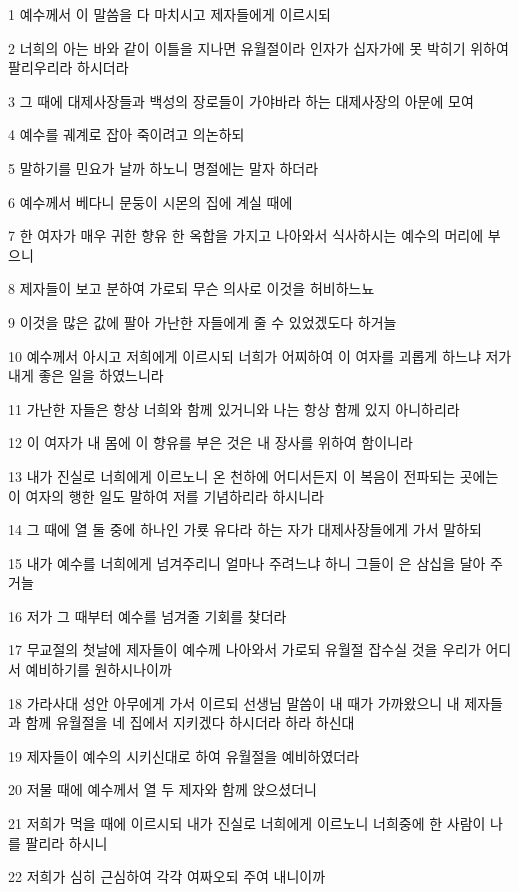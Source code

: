 \par 1 예수께서 이 말씀을 다 마치시고 제자들에게 이르시되
\par 2 너희의 아는 바와 같이 이틀을 지나면 유월절이라 인자가 십자가에 못 박히기 위하여 팔리우리라 하시더라
\par 3 그 때에 대제사장들과 백성의 장로들이 가야바라 하는 대제사장의 아문에 모여
\par 4 예수를 궤계로 잡아 죽이려고 의논하되
\par 5 말하기를 민요가 날까 하노니 명절에는 말자 하더라
\par 6 예수께서 베다니 문둥이 시몬의 집에 계실 때에
\par 7 한 여자가 매우 귀한 향유 한 옥합을 가지고 나아와서 식사하시는 예수의 머리에 부으니
\par 8 제자들이 보고 분하여 가로되 무슨 의사로 이것을 허비하느뇨
\par 9 이것을 많은 값에 팔아 가난한 자들에게 줄 수 있었겠도다 하거늘
\par 10 예수께서 아시고 저희에게 이르시되 너희가 어찌하여 이 여자를 괴롭게 하느냐 저가 내게 좋은 일을 하였느니라
\par 11 가난한 자들은 항상 너희와 함께 있거니와 나는 항상 함께 있지 아니하리라
\par 12 이 여자가 내 몸에 이 향유를 부은 것은 내 장사를 위하여 함이니라
\par 13 내가 진실로 너희에게 이르노니 온 천하에 어디서든지 이 복음이 전파되는 곳에는 이 여자의 행한 일도 말하여 저를 기념하리라 하시니라
\par 14 그 때에 열 둘 중에 하나인 가룟 유다라 하는 자가 대제사장들에게 가서 말하되
\par 15 내가 예수를 너희에게 넘겨주리니 얼마나 주려느냐 하니 그들이 은 삼십을 달아 주거늘
\par 16 저가 그 때부터 예수를 넘겨줄 기회를 찾더라
\par 17 무교절의 첫날에 제자들이 예수께 나아와서 가로되 유월절 잡수실 것을 우리가 어디서 예비하기를 원하시나이까
\par 18 가라사대 성안 아무에게 가서 이르되 선생님 말씀이 내 때가 가까왔으니 내 제자들과 함께 유월절을 네 집에서 지키겠다 하시더라 하라 하신대
\par 19 제자들이 예수의 시키신대로 하여 유월절을 예비하였더라
\par 20 저물 때에 예수께서 열 두 제자와 함께 앉으셨더니
\par 21 저희가 먹을 때에 이르시되 내가 진실로 너희에게 이르노니 너희중에 한 사람이 나를 팔리라 하시니
\par 22 저희가 심히 근심하여 각각 여짜오되 주여 내니이까
